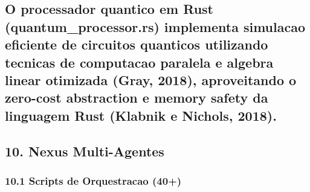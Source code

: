\documentclass[
  12pt,
]{article}
\begin{document}
\subsection{O processador quantico em Rust (quantum\_processor.rs)
implementa simulacao eficiente de circuitos quanticos utilizando
tecnicas de computacao paralela e algebra linear otimizada (Gray, 2018),
aproveitando o zero-cost abstraction e memory safety da linguagem Rust
(Klabnik e Nichols,
2018).}\label{o-processador-quantico-em-rust-quantum_processor.rs-implementa-simulacao-eficiente-de-circuitos-quanticos-utilizando-tecnicas-de-computacao-paralela-e-algebra-linear-otimizada-gray-2018-aproveitando-o-zero-cost-abstraction-e-memory-safety-da-linguagem-rust-klabnik-e-nichols-2018.}

\subsection{10. Nexus Multi-Agentes}\label{nexus-multi-agentes}

\subsubsection{10.1 Scripts de Orquestracao
(40+)}\label{scripts-de-orquestracao-40}
\end{document}
